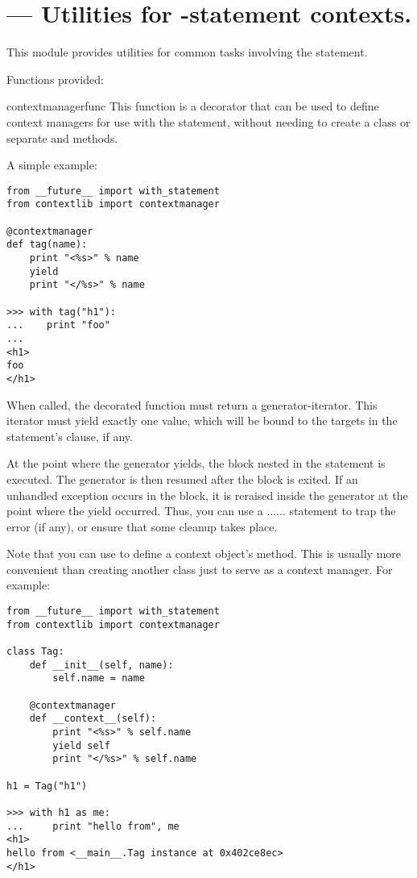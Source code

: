 \section{ ---
         Utilities for -statement contexts.}



This module provides utilities for common tasks involving the
 statement.

Functions provided:

\begin{funcdesc}{contextmanager}{func}
This function is a decorator that can be used to define context managers
for use with the  statement, without needing to create a
class or separate  and  methods.

A simple example:

\begin{verbatim}
from __future__ import with_statement
from contextlib import contextmanager

@contextmanager
def tag(name):
    print "<%s>" % name
    yield
    print "</%s>" % name

>>> with tag("h1"):
...    print "foo"
...
<h1>
foo
</h1>
\end{verbatim}

When called, the decorated function must return a generator-iterator.
This iterator must yield exactly one value, which will be bound to the
targets in the  statement's  clause, if any.

At the point where the generator yields, the block nested in the
 statement is executed.  The generator is then resumed
after the block is exited.  If an unhandled exception occurs in the
block, it is reraised inside the generator at the point where the yield
occurred.  Thus, you can use a
...... statement to trap
the error (if any), or ensure that some cleanup takes place.

Note that you can use  to define a context
object's  method.  This is usually more convenient
than creating another class just to serve as a context manager.
For example:

\begin{verbatim}
from __future__ import with_statement
from contextlib import contextmanager

class Tag:
    def __init__(self, name):
        self.name = name
        
    @contextmanager
    def __context__(self):
        print "<%s>" % self.name
        yield self
        print "</%s>" % self.name
        
h1 = Tag("h1")

>>> with h1 as me:
...     print "hello from", me
<h1>
hello from <__main__.Tag instance at 0x402ce8ec>
</h1>
\end{verbatim}
\end{funcdesc}

